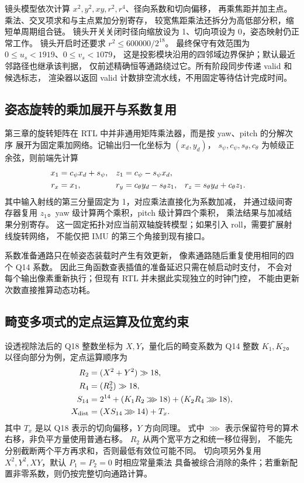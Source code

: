 镜头模型依次计算 $x^2,y^2,xy,r^2,r^4$、径向系数和切向偏移，
再乘焦距并加主点。乘法、交叉项求和与主点累加分别寄存，
较宽焦距乘法还拆分为高低部分积，缩短单周期组合链。
镜头开关关闭时径向缩放设为 1、切向项设为 0，姿态映射仍正常工作。
镜头开启时还要求 $r^2\le600000/2^{18}$。
最终保守有效范围为 $0\le u_s<1919$、$0\le v_s<1079$，
这是投影模块沿用的四邻域边界保护；默认最近邻路径也继承该判据，
仅前述精确恒等通路绕过它。所有阶段同步传递 valid 和候选标志，
渲染器以返回 valid 计数排空流水线，不用固定等待估计完成时间。

\subsection{姿态旋转的乘加展开与系数复用}
第三章的旋转矩阵在 RTL 中并非通用矩阵乘法器，而是按 yaw、pitch 的分解次序
展开为固定乘加网络。记输出归一化坐标为 $(x_d,y_d)$，
$s_\psi,c_\psi,s_\theta,c_\theta$ 为帧级正余弦，则前端先计算
\begin{align}
 x_1&=c_\psi x_d+s_\psi,&
 z_1&=c_\psi-s_\psi x_d,\notag\\
 r_x&=x_1,&
 r_y&=c_\theta y_d-s_\theta z_1,&
 r_z&=s_\theta y_d+c_\theta z_1.
 \label{eq:fpga-rotation-expanded}
\end{align}
其中输入射线的第三分量固定为 1，对应乘法直接化为系数加减，
并通过级间寄存器复用 $z_1$。yaw 级计算两个乘积，pitch 级计算四个乘积，
乘法结果与加减结果分别寄存。
这一固定拓扑对应当前双轴旋转模型；如果引入 roll，需要扩展射线旋转网络，
不能仅把 IMU 的第三个角接到现有接口。

系数准备通路只在帧姿态装载时产生有效更新，
像素通路随后重复使用相同的四个 Q14 系数。
因此三角函数查表插值的准备延迟只需在帧启动时支付，
不会对每个输出像素重新执行；但现有 RTL 并未据此实现独立的时钟门控，
不能由更新次数直接推算动态功耗。

\subsection{畸变多项式的定点运算及位宽约束}
设透视除法后的 Q18 整数坐标为 $X,Y$，量化后的畸变系数为 Q14 整数 $K_1,K_2$。
以径向部分为例，定点运算顺序为
\begin{align}
 R_2&=(X^2+Y^2)\gg18,\notag\\
 R_4&=(R_2^2)\gg18,\notag\\
 S_{14}&=2^{14}+(K_1R_2\mathbin{\ggg}18)
                   +(K_2R_4\mathbin{\ggg}18),\notag\\
 X_{\mathrm{dist}}&=(XS_{14}\mathbin{\ggg}14)+T_x.
 \label{eq:fpga-radial-fixed}
\end{align}
其中 $T_x$ 是以 Q18 表示的切向偏移，$Y$ 方向同理。
式中 $\ggg$ 表示保留符号的算术右移，非负平方量使用普通右移。
$R_2$ 从两个宽平方之和统一移位得到，
不能先分别截断两个平方再求和，否则最低有效位可能不同。
切向项另外复用 $X^2,Y^2,XY$，默认 $P_1=P_2=0$ 时相应常量乘法
具备被综合消除的条件；若重新配置非零系数，则仍按完整切向通路计算。

